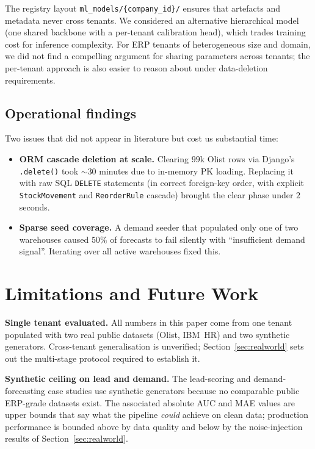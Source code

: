 \documentclass[conference]{IEEEtran}
\begin{document}
The registry layout \texttt{ml\_models/\{company\_id\}/} ensures that
artefacts and metadata never cross tenants. We considered an alternative
hierarchical model (one shared backbone with a per-tenant calibration head),
which trades training cost for inference complexity. For ERP tenants of
heterogeneous size and domain, we did not find a compelling argument for
sharing parameters across tenants; the per-tenant approach is also easier to
reason about under data-deletion requirements.

\subsection{Operational findings}

Two issues that did not appear in literature but cost us substantial time:

\begin{itemize}
    \item \textbf{ORM cascade deletion at scale.} Clearing $99$k Olist rows
    via Django's \texttt{.delete()} took $\sim$$30$ minutes due to in-memory
    PK loading. Replacing it with raw SQL \texttt{DELETE} statements (in
    correct foreign-key order, with explicit \texttt{StockMovement} and
    \texttt{ReorderRule} cascade) brought the clear phase under $2$ seconds.
    \item \textbf{Sparse seed coverage.} A demand seeder that populated only
    one of two warehouses caused $50\%$ of forecasts to fail silently with
    ``insufficient demand signal''. Iterating over all active warehouses
    fixed this.
\end{itemize}

\section{Limitations and Future Work}
\label{sec:limits}

\textbf{Single tenant evaluated.} All numbers in this paper come from one
tenant populated with two real public datasets (Olist, IBM~HR) and two
synthetic generators. Cross-tenant generalisation is unverified;
Section~\ref{sec:realworld} sets out the multi-stage protocol required to
establish it.

\textbf{Synthetic ceiling on lead and demand.} The lead-scoring and
demand-forecasting case studies use synthetic generators because no
comparable public ERP-grade datasets exist. The associated absolute AUC and
MAE values are upper bounds that say what the pipeline \emph{could} achieve
on clean data; production performance is bounded above by data quality and
below by the noise-injection results of Section~\ref{sec:realworld}.
\end{document}
